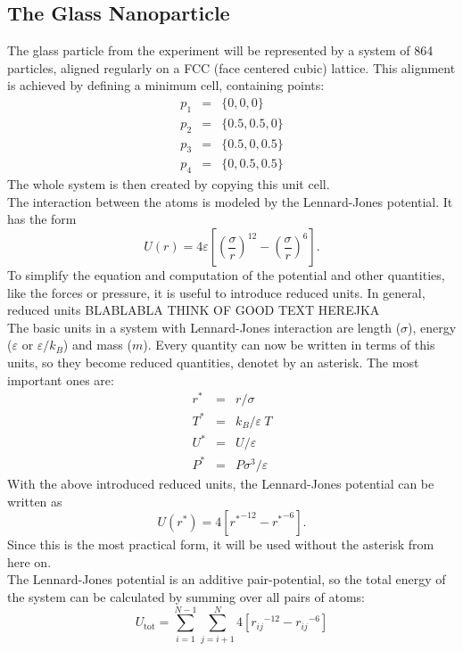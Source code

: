 \documentclass[12pt]{article}
\begin{document}
\subsection{The Glass Nanoparticle}
The glass particle from the experiment will be represented by a system of 864 particles, aligned regularly on a FCC (face centered cubic) lattice.
This alignment is achieved by defining a minimum cell, containing points:
\begin{eqnarray*}
    p_1 &=& \{0,0,0\}\\
    p_2 &=& \{0.5,0.5,0\}\\
    p_3 &=& \{0.5,0,0.5\}\\
    p_4 &=& \{0,0.5,0.5\}
\end{eqnarray*}
The whole system is then  created by copying this unit cell.\\
The interaction between the atoms is modeled by the Lennard-Jones potential. It has the form
\begin{equation}
    U(r) = 4\varepsilon\left[\left(\frac\sigma r\right)^{12} - \left(\frac\sigma r\right)^6\right].
\end{equation}
To simplify the equation and computation of the potential and other quantities, like the forces or pressure, it is useful to introduce reduced units.
In general, reduced units BLABLABLA THINK OF GOOD TEXT HEREJKA\\
The basic units in a system with Lennard-Jones interaction are length ($\sigma$), energy ($\varepsilon$ or $\varepsilon / k_B$) and mass ($m$). Every 
quantity can now be written in terms of this units, so they become reduced quantities, denotet by an asterisk. The most important ones are:
\begin{eqnarray*}
    r^* &=& r/\sigma\\
    T^* &=& k_B/\varepsilon \ T\\
    U^* &=& U/\varepsilon \\
    P^* &=& P \sigma^3/\varepsilon 
\end{eqnarray*}
With the above introduced reduced units, the Lennard-Jones potential can be written as
\begin{equation}
    U(r^*) = 4\left[{r^*}^{-12} - {r^*}^{-6}\right].
\end{equation}
Since this is the most practical form, it will be used without the asterisk from here on.\\
The Lennard-Jones potential is an additive pair-potential, so the total energy of the system can be calculated by summing over all pairs of atoms:
\begin{equation}
    U_{\text{tot}} = \sum_{i=1}^{N-1}\sum_{j=i+1}^N4\left[{r_{ij}}^{-12} - {r_{ij}}^{-6}\right]
\end{equation}
\end{document}
